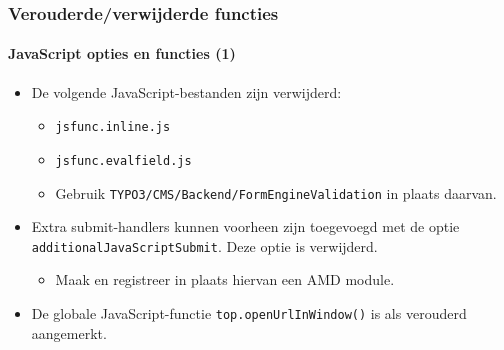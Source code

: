 
\begin{frame}[fragile]
	\frametitle{Verouderde/verwijderde functies}
	\framesubtitle{JavaScript opties en functies (1)}

	\begin{itemize}
		\item De volgende JavaScript-bestanden zijn verwijderd:

			\begin{itemize}
				\item \texttt{jsfunc.inline.js}
				\item \texttt{jsfunc.evalfield.js}
			\end{itemize}

			\begin{itemize}\smaller
				\item[\ding{228}] Gebruik \texttt{TYPO3/CMS/Backend/FormEngineValidation} in plaats daarvan.
			\end{itemize}\normalsize

		\item Extra submit-handlers kunnen voorheen zijn toegevoegd met de optie \texttt{additionalJavaScriptSubmit}.
			Deze optie is verwijderd.

			\begin{itemize}\smaller
				\item[\ding{228}] Maak en registreer in plaats hiervan een AMD module.
			\end{itemize}\normalsize

		\item De globale JavaScript-functie \texttt{top.openUrlInWindow()} is als verouderd aangemerkt.

	\end{itemize}

\end{frame}


